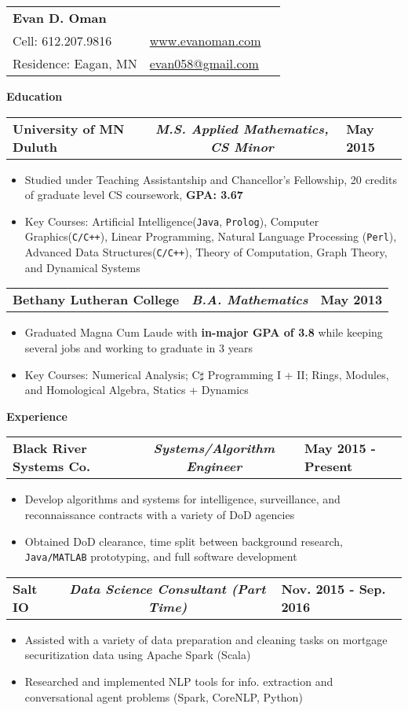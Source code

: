 \documentclass[letterpaper,10pt]{article}
\newcommand{\myitem}{\item[$\triangleright$]}
\newcommand{\resHeading}[1]{{
		\begin{tcolorbox}[size=title, sharp corners, colback=mygrey, colframe=mygrey]
			\centering\textbf{\large #1}
		\end{tcolorbox} 
	}}
\newcommand{\threeColSubHeading}[3]{
		\begin{tabularx}{\textwidth}{XcX}
				\textbf{#1} & \textit{\textbf{#2}}  & \hfill\textbf{#3}
		\end{tabularx}
	}
\begin{document}
	\begin{tabularx}{\textwidth}{lXr}
		\textbf{\Large Evan D. Oman}  &   \\
		Cell: 612.207.9816 & \hfill\href{http://www.evanoman.com}{www.evanoman.com}\\
		Residence: Eagan, MN& \hfill\href{mailto:evan058@gmail.com}{evan058@gmail.com}\\
	\end{tabularx}
	\resHeading{Education}
		\threeColSubHeading{University of MN Duluth}{M.S. Applied Mathematics, CS Minor}{May 2015}
			\begin{itemize}
				\myitem Studied under Teaching Assistantship and Chancellor's Fellowship, 20 credits of graduate level CS coursework, \textbf{GPA: 3.67}
				\myitem Key Courses: Artificial Intelligence(\verb!Java!, \verb!Prolog!), Computer Graphics(\verb!C/C++!), Linear Programming, Natural Language Processing (\verb!Perl!), Advanced Data Structures(\verb!C/C++!), Theory of Computation, Graph Theory, and Dynamical Systems
			\end{itemize}
		\threeColSubHeading{Bethany Lutheran College}{B.A. Mathematics}{May 2013}
			\begin{itemize}
				\myitem Graduated Magna Cum Laude with \textbf{in-major GPA of 3.8} while keeping several jobs and working to graduate in 3 years
				\myitem Key Courses: Numerical Analysis; C$\sharp$ Programming I + II; Rings, Modules, and Homological Algebra, Statics + Dynamics
			\end{itemize}
	\resHeading{Experience}
		\threeColSubHeading{Black River Systems Co.}{Systems/Algorithm Engineer}{May 2015 - Present}
			\begin{itemize}
				\myitem Develop algorithms and systems for intelligence, surveillance, and reconnaissance contracts with a variety of DoD agencies
				\myitem Obtained DoD clearance, time split between background research, \verb!Java/MATLAB! prototyping, and full software development
			\end{itemize}
		\threeColSubHeading{Salt IO}{Data Science Consultant (Part Time)}{Nov. 2015 - Sep. 2016}
			\begin{itemize}
				\myitem Assisted with a variety of data preparation and cleaning tasks on mortgage securitization data using Apache Spark (Scala)
				\myitem Researched and implemented NLP tools for info. extraction and conversational agent problems (Spark, CoreNLP, Python)
			\end{itemize}
\end{document}
